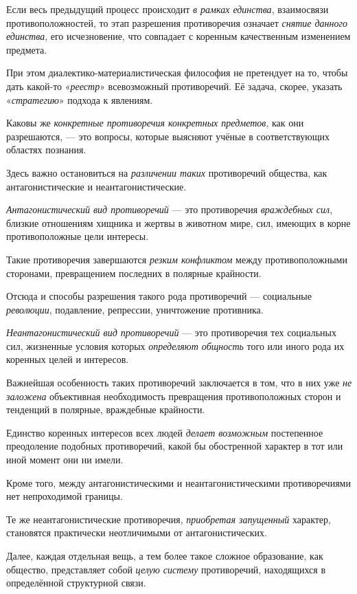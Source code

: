 \documentclass[a4paper,14pt,russian]{extreport}
\begin{document}
Если весь предыдущий процесс происходит \emph{в рамках единства}, взаимосвязи противоположностей, то этап разрешения противоречия означает \emph{снятие данного единства}, его исчезновение, что совпадает с коренным качественным изменением предмета.

При этом диалектико-материалистическая философия не претендует на то, чтобы дать какой-то «\emph{реестр}» всевозможный противоречий. Её задача, скорее, указать «\emph{стратегию}» подхода к явлениям.

Каковы же \emph{конкретные противоречия конкретных предметов}, как они разрешаются, --- это вопросы, которые выясняют учёные в соответствующих областях познания.

Здесь важно остановиться на \emph{различении таких} противоречий общества, как антагонистические и неантагонистические.

\emph{Антагонистический вид противоречий} --- это противоречия \emph{враждебных сил}, близкие отношениям хищника и жертвы в животном мире, сил, имеющих в корне противоположные цели интересы.

Такие противоречия завершаются \emph{резким конфликтом} между противоположными сторонами, превращением последних в полярные крайности.

Отсюда и способы разрешения такого рода противоречий --- социальные \emph{революции}, подавление, репрессии, уничтожение противника.

\emph{Неантагонистический вид противоречий} --- это противоречия тех социальных сил, жизненные условия которых \emph{определяют общность} того или иного рода их коренных целей и интересов.

Важнейшая особенность таких противоречий заключается в том, что в них уже \emph{не заложена} объективная необходимость превращения противоположных сторон и тенденций в полярные, враждебные крайности.

Единство коренных интересов всех людей \emph{делает возможным} постепенное преодоление подобных противоречий, какой бы обостренной характер в тот или иной момент они ни имели.

Кроме того, между антагонистическими и неантагонистическими противоречиями нет непроходимой границы.

Те же неантагонистические противоречия, \emph{приобретая запущенный} характер, становятся практически неотличимыми от антагонистических.

Далее, каждая отдельная вещь, а тем более такое сложное образование, как общество, представляет собой \emph{целую систему} противоречий, находящихся в определённой структурной связи.
\end{document}
